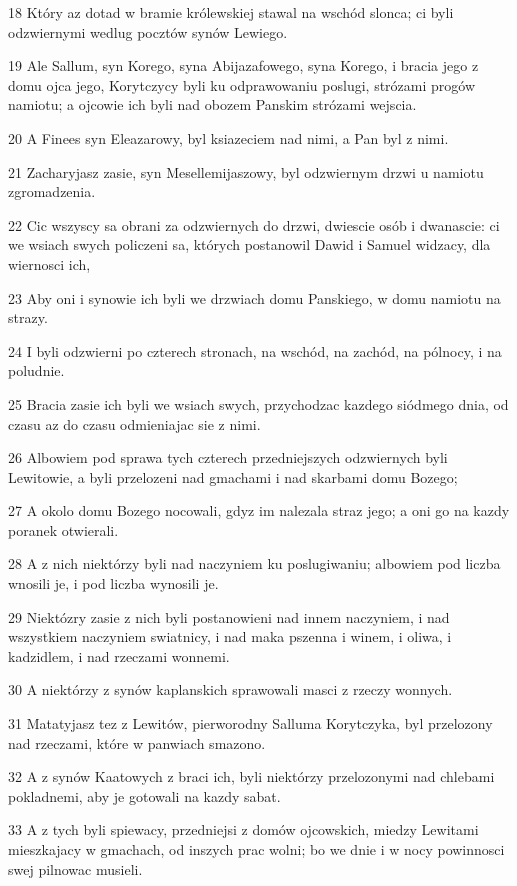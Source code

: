 \par 18 Który az dotad w bramie królewskiej stawal na wschód slonca; ci byli odzwiernymi wedlug pocztów synów Lewiego.
\par 19 Ale Sallum, syn Korego, syna Abijazafowego, syna Korego, i bracia jego z domu ojca jego, Korytczycy byli ku odprawowaniu poslugi, strózami progów namiotu; a ojcowie ich byli nad obozem Panskim strózami wejscia.
\par 20 A Finees syn Eleazarowy, byl ksiazeciem nad nimi, a Pan byl z nimi.
\par 21 Zacharyjasz zasie, syn Mesellemijaszowy, byl odzwiernym drzwi u namiotu zgromadzenia.
\par 22 Cic wszyscy sa obrani za odzwiernych do drzwi, dwiescie osób i dwanascie: ci we wsiach swych policzeni sa, których postanowil Dawid i Samuel widzacy, dla wiernosci ich,
\par 23 Aby oni i synowie ich byli we drzwiach domu Panskiego, w domu namiotu na strazy.
\par 24 I byli odzwierni po czterech stronach, na wschód, na zachód, na pólnocy, i na poludnie.
\par 25 Bracia zasie ich byli we wsiach swych, przychodzac kazdego siódmego dnia, od czasu az do czasu odmieniajac sie z nimi.
\par 26 Albowiem pod sprawa tych czterech przedniejszych odzwiernych byli Lewitowie, a byli przelozeni nad gmachami i nad skarbami domu Bozego;
\par 27 A okolo domu Bozego nocowali, gdyz im nalezala straz jego; a oni go na kazdy poranek otwierali.
\par 28 A z nich niektórzy byli nad naczyniem ku poslugiwaniu; albowiem pod liczba wnosili je, i pod liczba wynosili je.
\par 29 Niektózry zasie z nich byli postanowieni nad innem naczyniem, i nad wszystkiem naczyniem swiatnicy, i nad maka pszenna i winem, i oliwa, i kadzidlem, i nad rzeczami wonnemi.
\par 30 A niektórzy z synów kaplanskich sprawowali masci z rzeczy wonnych.
\par 31 Matatyjasz tez z Lewitów, pierworodny Salluma Korytczyka, byl przelozony nad rzeczami, które w panwiach smazono.
\par 32 A z synów Kaatowych z braci ich, byli niektórzy przelozonymi nad chlebami pokladnemi, aby je gotowali na kazdy sabat.
\par 33 A z tych byli spiewacy, przedniejsi z domów ojcowskich, miedzy Lewitami mieszkajacy w gmachach, od inszych prac wolni; bo we dnie i w nocy powinnosci swej pilnowac musieli.
